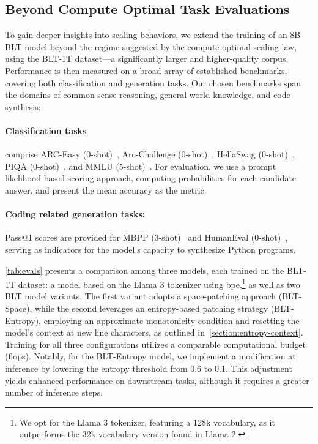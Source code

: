 \subsection{Beyond Compute Optimal Task Evaluations}
\label{section:evals}
To gain deeper insights into scaling behaviors, we extend the training of an 8B {\textsc BLT} model beyond the regime suggested by the compute-optimal scaling law, using the {\textsc BLT}-1T dataset—a significantly larger and higher-quality corpus. Performance is then measured on a broad array of established benchmarks, covering both classification and generation tasks. Our chosen benchmarks span the domains of common sense reasoning, general world knowledge, and code synthesis:
\paragraph{Classification tasks} comprise ARC-Easy (0-shot)~\citep{Eval_ARC}, Arc-Challenge (0-shot)~\citep{Eval_ARC}, HellaSwag (0-shot)~\citep{Eval_hellaswag}, PIQA (0-shot)~\citep{Eval_piqa}, and MMLU (5-shot)~\citep{hendrycks2020measuring}. For evaluation, we use a prompt likelihood-based scoring approach, computing probabilities for each candidate answer, and present the mean accuracy as the metric.
\paragraph{Coding related generation tasks:} Pass@1 scores are provided for MBPP (3-shot)~\citep{Eval_MBPP} and HumanEval (0-shot)~\citep{Eval_HumanEval}, serving as indicators for the model’s capacity to synthesize Python programs.

\autoref{tab:evals} presents a comparison among three models, each trained on the {\textsc BLT}-1T dataset: a model based on the Llama 3 tokenizer using bpe,\footnote{We opt for the Llama 3 tokenizer, featuring a 128k vocabulary, as it outperforms the 32k vocabulary version found in Llama 2.} as well as two {\textsc BLT} model variants. The first variant adopts a space-patching approach ({\textsc BLT}-Space), while the second leverages an entropy-based patching strategy ({\textsc BLT}-Entropy), employing an approximate monotonicity condition and resetting the model’s context at new line characters, as outlined in~\autoref{section:entropy-context}. Training for all three configurations utilizes a comparable computational budget (flops). Notably, for the {\textsc BLT}-Entropy model, we implement a modification at inference by lowering the entropy threshold from 0.6 to 0.1. This adjustment yields enhanced performance on downstream tasks, although it requires a greater number of inference steps.


